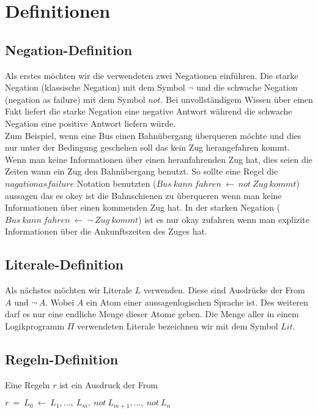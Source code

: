 \section{Definitionen}


\subsection{Negation-Definition}

Als erstes möchten wir die verwendeten zwei Negationen einführen.
Die starke Negation (klassische Negation) mit dem Symbol $\neg$ und die
schwache Negation (negation as failure) mit dem Symbol $not$.
Bei unvollständigem Wissen über einen Fakt liefert die starke Negation
eine negative Antwort während die schwache Negation eine positive Antwort liefern würde.\\

Zum Beispiel, wenn eine Bus einen Bahnübergang überqueren möchte und dies nur unter der Bedingung geschehen soll das kein Zug herangefahren kommt. Wenn man keine Informationen über einen heranfahrenden Zug hat, dies seien die Zeiten wann ein Zug den Bahnübergang benutzt. So sollte eine Regel die $nagation as failure$ Notation benutzten ($Bus~kann~fahren~\leftarrow~not~Zug~kommt$) aussagen das es okey ist die Bahnschienen zu überqueren wenn man keine Informationen über einen kommenden Zug hat. In der starken Negation ($Bus~kann~fahren~\leftarrow~\neg~Zug~kommt$) ist es nur okay zufahren wenn man explizite Informationen über die Ankunftszeiten des Zuges hat.


\subsection{Literale-Definition}

Als nächstes möchten wir Literale $L$ verwenden.
Diese sind Ausdrücke der From $A$ und $\neg~A$.
Wobei $A$ ein Atom einer aussagenlogischen Sprache ist.
Des weiteren darf es nur eine endliche Menge dieser Atome geben.
Die Menge aller in einem Logikprogramm $\Pi$ verwendeten Literale
bezeichnen wir mit dem Symbol $Lit$.


\subsection{Regeln-Definition}

Eine Regeln $r$ ist ein Ausdruck der From

\begin{center}
	$r~=~L_0~\leftarrow~L_1,...,~L_m,~not~L_{m+1},...,~not~L_n$\\
\end{center}

